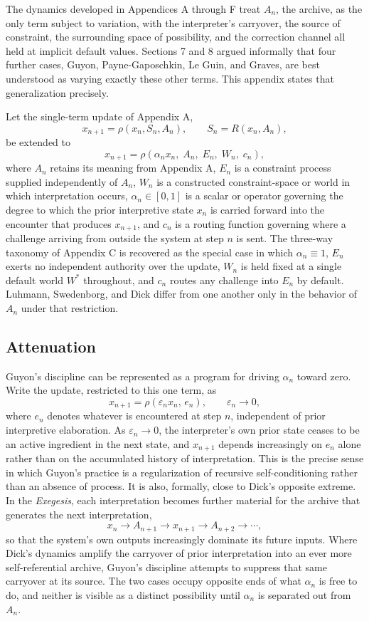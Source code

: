 \documentclass[11pt]{article}
\begin{document}
The dynamics developed in Appendices A through F treat $A_n$, the archive, as the only term subject to variation, with the interpreter's carryover, the source of constraint, the surrounding space of possibility, and the correction channel all held at implicit default values. Sections 7 and 8 argued informally that four further cases, Guyon, Payne-Gaposchkin, Le Guin, and Graves, are best understood as varying exactly these other terms. This appendix states that generalization precisely.

Let the single-term update of Appendix A,
\[
x_{n+1} = \rho(x_n, S_n, A_n),
\qquad S_n = R(x_n, A_n),
\]
be extended to
\[
\boxed{
x_{n+1} = \rho\!\left(\alpha_n x_n,\; A_n,\; E_n,\; W_n,\; c_n\right),
}
\]
where $A_n$ retains its meaning from Appendix A, $E_n$ is a constraint process supplied independently of $A_n$, $W_n$ is a constructed constraint-space or world in which interpretation occurs, $\alpha_n \in [0,1]$ is a scalar or operator governing the degree to which the prior interpretive state $x_n$ is carried forward into the encounter that produces $x_{n+1}$, and $c_n$ is a routing function governing where a challenge arriving from outside the system at step $n$ is sent. The three-way taxonomy of Appendix C is recovered as the special case in which $\alpha_n \equiv 1$, $E_n$ exerts no independent authority over the update, $W_n$ is held fixed at a single default world $W^\ast$ throughout, and $c_n$ routes any challenge into $E_n$ by default. Luhmann, Swedenborg, and Dick differ from one another only in the behavior of $A_n$ under that restriction.

\subsection*{Attenuation}

Guyon's discipline can be represented as a program for driving $\alpha_n$ toward zero. Write the update, restricted to this one term, as
\[
x_{n+1} = \rho\!\left(\varepsilon_n x_n,\, e_n\right),
\qquad \varepsilon_n \to 0,
\]
where $e_n$ denotes whatever is encountered at step $n$, independent of prior interpretive elaboration. As $\varepsilon_n \to 0$, the interpreter's own prior state ceases to be an active ingredient in the next state, and $x_{n+1}$ depends increasingly on $e_n$ alone rather than on the accumulated history of interpretation. This is the precise sense in which Guyon's practice is a regularization of recursive self-conditioning rather than an absence of process. It is also, formally, close to Dick's opposite extreme. In the \emph{Exegesis}, each interpretation becomes further material for the archive that generates the next interpretation,
\[
x_n \longrightarrow A_{n+1} \longrightarrow x_{n+1} \longrightarrow A_{n+2} \longrightarrow \cdots,
\]
so that the system's own outputs increasingly dominate its future inputs. Where Dick's dynamics amplify the carryover of prior interpretation into an ever more self-referential archive, Guyon's discipline attempts to suppress that same carryover at its source. The two cases occupy opposite ends of what $\alpha_n$ is free to do, and neither is visible as a distinct possibility until $\alpha_n$ is separated out from $A_n$.
\end{document}
